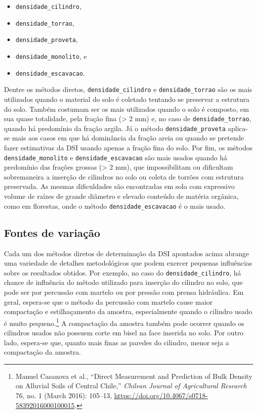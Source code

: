 \documentclass[a4paper,dvipsnames]{tufte-book}
\providecommand{\tightlist}{%
  \setlength{\itemsep}{0pt}\setlength{\parskip}{0pt}}
\begin{document}
\begin{itemize}
\tightlist
\item
  \texttt{densidade\_cilindro},
\item
  \texttt{densidade\_torrao},
\item
  \texttt{densidade\_proveta},
\item
  \texttt{densidade\_monolito}, e
\item
  \texttt{densidade\_escavacao}.
\end{itemize}

Dentre os métodos diretos, \texttt{densidade\_cilindro} e
\texttt{densidade\_torrao} são os mais utilizados quando o material do
solo é coletado tentando se preservar a estrutura do solo. Também
costumam ser os mais utilizados quando o solo é composto, em sua quase
totalidade, pela fração fina (\textgreater{} 2 mm) e, no caso de
\texttt{densidade\_torrao}, quando há predomínio da fração argila. Já o
método \texttt{densidade\_proveta} aplica-se mais aos casos em que há
dominância da fração areia ou quando se pretende fazer estimativas da
DSI usando apenas a fração fina do solo. Por fim, os métodos
\texttt{densidade\_monolito} e \texttt{densidade\_escavacao} são mais
usados quando há predomínio das frações grossas (\textgreater{} 2 mm),
que impossibilitam ou dificultam sobremaneira a inserção de cilindros no
solo ou coleta de torrões com estrutura preservada. As mesmas
dificuldades são encontradas em solo com expressivo volume de raízes de
grande diâmetro e elevado conteúdo de matéria orgânica, como em
florestas, onde o método \texttt{densidade\_escavacao} é o mais usado.

\subsection{Fontes de variação}\label{fontes-de-variauxe7uxe3o-1}

Cada um dos métodos diretos de determinação da DSI apontados acima
abrange uma variedade de detalhes metodológicos que podem exercer
pequenas influências sobre os resultados obtidos. Por exemplo, no caso
do \texttt{densidade\_cilindro}, há chance de influência do método
utilizado para inserção do cilindro no solo, que pode ser por percussão
com martelo ou por pressão com prensa hidráulica. Em geral, espera-se
que o método da percussão com martelo cause maior compactação e
estilhaçamento da amostra, especialmente quando o cilindro usado é muito
pequeno.\footnote{Manuel Casanova et al., ``Direct Measurement and
  Prediction of Bulk Density on Alluvial Soils of Central Chile,''
  \emph{Chilean Journal of Agricultural Research} 76, no. 1 (March
  2016): 105--13, \url{https://doi.org/10.4067/s0718-58392016000100015}.}
A compactação da amostra também pode ocorrer quando os cilindros usados
não possuem corte em bisel na face inserida no solo. Por outro lado,
espera-se que, quanto mais finas as paredes do cilindro, menor seja a
compactação da amostra.
\end{document}
